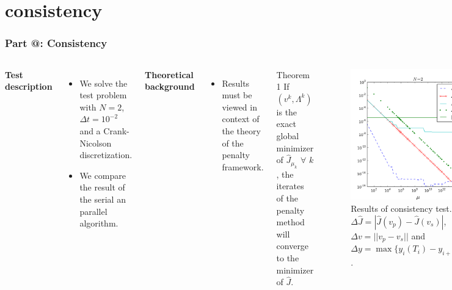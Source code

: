 \documentclass[9pt]{beamer}
\makeatletter
\newcommand*{\rom}[1]{\expandafter\@slowromancap\romannumeral #1@}
\makeatother
\begin{document}
\section{consistency}
\begin{frame}
\frametitle{\textbf{ Part \rom{5}:} Consistency}
\begin{columns}
\textbf{Test description}
\begin{itemize}
\item{We solve the test problem with $N=2$, $\Delta t=10^{-2}$ and a Crank-Nicolson discretization.}
\item{We compare the result of the serial an parallel algorithm. }
\end{itemize}
\textbf{Theoretical background}
\begin{itemize}
\item{Results must be viewed in context of the theory of the penalty framework.}
\end{itemize}
\begin{block}{Theorem 1}
If $(v^k,\Lambda^k)$ is the exact global minimizer of $\hat J_{\mu_{k}}$ $\forall$ $k$, the iterates of the penalty method will converge to the minimizer of $\hat J$.
\end{block}
\begin{figure}[!h]
\centering
\includegraphics[scale=0.35]{con2.png}
\caption{{\tiny Results of consistency test. $\Delta \hat J=|\hat J(v_p)-\hat J(v_s)|$, $\Delta v = ||v_p-v_s||$ and $\Delta y=\max\{y_i(T_i)-y_{i+1}(T_i)\}$. }}
\end{figure}
\end{columns}
\end{frame}
\end{document}
